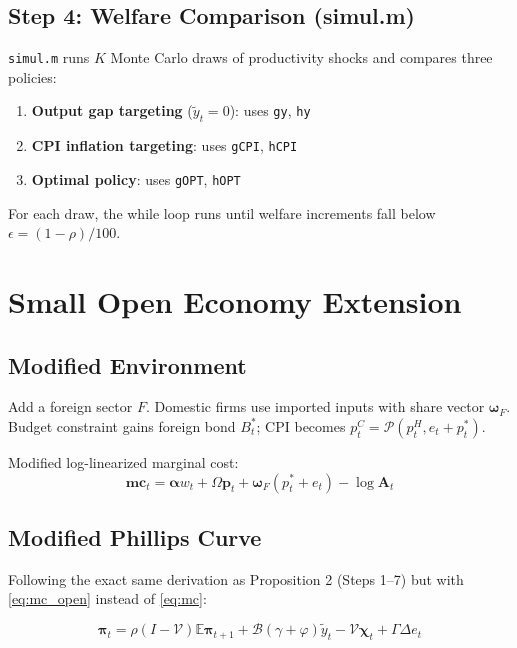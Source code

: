 \documentclass[12pt]{article}
\begin{document}
\subsection{Step 4: Welfare Comparison (simul.m)}

\texttt{simul.m} runs $K$ Monte Carlo draws of productivity shocks and compares three policies:
\begin{enumerate}
    \item \textbf{Output gap targeting} ($\tilde{y}_t = 0$): uses \texttt{gy}, \texttt{hy}
    \item \textbf{CPI inflation targeting}: uses \texttt{gCPI}, \texttt{hCPI}
    \item \textbf{Optimal policy}: uses \texttt{gOPT}, \texttt{hOPT}
\end{enumerate}
For each draw, the while loop runs until welfare increments fall below $\epsilon = (1-\rho)/100$.

\section{Small Open Economy Extension}

\subsection{Modified Environment}

Add a foreign sector $F$. Domestic firms use imported inputs with share vector $\bm{\omega}_F$. Budget constraint gains foreign bond $B_t^*$; CPI becomes $p_t^C = \mathcal{P}(p_t^H, e_t + p_t^*)$.

Modified log-linearized marginal cost:
\begin{equation}
    \bm{mc}_t = \bm{\alpha}w_t + \Omega\bm{p}_t + \bm{\omega}_F(p_t^* + e_t) - \log\mathbf{A}_t
    \label{eq:mc_open}
\end{equation}

\subsection{Modified Phillips Curve}

Following the exact same derivation as Proposition 2 (Steps 1--7) but with \eqref{eq:mc_open} instead of \eqref{eq:mc}:

\begin{equation}
    \boxed{\bm{\pi}_t = \rho(I-\mathcal{V})\mathbb{E}\bm{\pi}_{t+1} + \mathcal{B}(\gamma+\varphi)\tilde{y}_t - \mathcal{V}\bm{\chi}_t + \Gamma\Delta e_t}
\end{equation}
\end{document}
